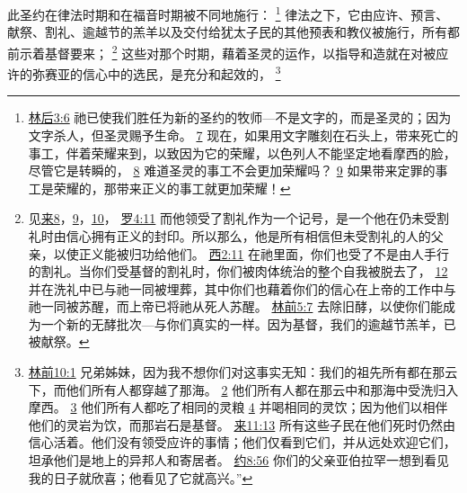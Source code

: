 \documentclass[12pt, a4paper, oneside]{ctexart}
\newcounter{parnum}[section]
\newcommand{\N}{%
   \noindent\refstepcounter{parnum}%
    \makebox[\parindent][l]{\textbf{\arabic{parnum}.}}}
\begin{document}
\N 此圣约在律法时期和在福音时期被不同地施行：
	\footnote {
		\href{https://biblehub.com/2_corinthians/3-6.htm}{林后3:6} 祂已使我们胜任为新的圣约的牧师---不是文字的，而是圣灵的；因为文字杀人，但圣灵赐予生命。
		\href{https://biblehub.com/2_corinthians/3-7.htm}{7} 现在，如果用文字雕刻在石头上，带来死亡的事工，伴着荣耀来到，以致因为它的荣耀，以色列人不能坚定地看摩西的脸，尽管它是转瞬的，
		\href{https://biblehub.com/2_corinthians/3-8.htm}{8} 难道圣灵的事工不会更加荣耀吗？
		\href{https://biblehub.com/2_corinthians/3-9.htm}{9} 如果带来定罪的事工是荣耀的，那带来正义的事工就更加荣耀！
	}
	律法之下，它由应许、预言、献祭、割礼、逾越节的羔羊以及交付给犹太子民的其他预表和教仪被施行，所有都前示着基督要来；
	\footnote {
		见\href{https://biblehub.com/niv/hebrews/8.htm}{来8}，\href{https://biblehub.com/niv/hebrews/9.htm}{9}，\href{https://biblehub.com/niv/hebrews/10.htm}{10}，
		\href{https://biblehub.com/romans/4-11.htm}{罗4:11} 而他领受了割礼作为一个记号，是一个他在仍未受割礼时由信心拥有正义的封印。所以那么，他是所有相信但未受割礼的人的父亲，以使正义能被归功给他们。
		\href{https://biblehub.com/colossians/2-11.htm}{西2:11} 在祂里面，你们也受了不是由人手行的割礼。当你们受基督的割礼时，你们被肉体统治的整个自我被脱去了，
		\href{https://biblehub.com/colossians/2-12.htm}{12} 并在洗礼中已与祂一同被埋葬，其中你们也藉着你们的信心在上帝的工作中与祂一同被苏醒，而上帝已将祂从死人苏醒。
		\href{https://biblehub.com/1_corinthians/5-7.htm}{林前5:7} 去除旧酵，以使你们能成为一个新的无酵批次---与你们真实的一样。因为基督，我们的逾越节羔羊，已被献祭。
	}
	这些对那个时期，藉着圣灵的运作，以指导和造就在对被应许的弥赛亚的信心中的选民，是充分和起效的，
	\footnote {
		\href{https://biblehub.com/1_corinthians/10-1.htm}{林前10:1} 兄弟姊妹，因为我不想你们对这事实无知：我们的祖先所有都在那云下，而他们所有人都穿越了那海。
		\href{https://biblehub.com/1_corinthians/10-2.htm}{2} 他们所有人都在那云中和那海中受洗归入摩西。
		\href{https://biblehub.com/1_corinthians/10-3.htm}{3} 他们所有人都吃了相同的灵粮
		\href{https://biblehub.com/1_corinthians/10-4.htm}{4} 并喝相同的灵饮；因为他们以相伴他们的灵岩为饮，而那岩石是基督。 
		\href{https://biblehub.com/hebrews/11-13.htm}{来11:13} 所有这些子民在他们死时仍然由信心活着。他们没有领受应许的事情；他们仅看到它们，并从远处欢迎它们，坦承他们是地上的异邦人和寄居者。
		\href{https://biblehub.com/john/8-56.htm}{约8:56} 你们的父亲亚伯拉罕一想到看见我的日子就欣喜；他看见了它就高兴。”
	}
\end{document}
